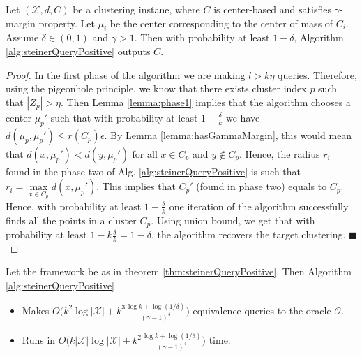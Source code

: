 \documentclass[orivec]{llncs}
\newcommand{\mc}{\mathcal}
\renewcommand{\qed}{\hfill\ensuremath{\blacksquare}}
\begin{document}
\begin{theorem}
\label{thm:steinerQueryPositive}
Let $(\mc X, d, C)$ be a clustering instane, where $C$ is center-based and satisfies $\gamma$-margin property. Let $\mu_i$ be the center corresponding to the center of mass of $C_i$.
Assume $\delta \in (0, 1)$ and $\gamma > 1$. Then with probability at least $1-\delta$, Algorithm \ref{alg:steinerQueryPositive} outputs $C$.
\end{theorem}

\begin{proof}
In the first phase of the algorithm we are making $l>k\eta$ queries. Therefore, using the pigeonhole principle, we know that there exists cluster index $p$ such that $|Z_p| > \eta$. Then Lemma \ref{lemma:phase1} implies that the algorithm chooses a center $\mu_p'$ such that with probability at least $1-\frac{\delta}{k}$ we have $d(\mu_p, \mu_p') \le r(C_p)\epsilon$. By Lemma \ref{lemma:hasGammaMargin}, this would mean that $d(x, \mu_p') < d(y, \mu_p')$ for all $x \in C_p$ and $y \not\in C_p$. Hence, the radius $r_i$ found in the phase two of Alg. \ref{alg:steinerQueryPositive} is such that $r_{i} = \max\limits_{x \in C_p} d(x, \mu_p')$. This implies that $C_p'$ (found in phase two) equals to $C_p$. Hence, with probability at least $1-\frac{\delta}{k}$ one iteration of the algorithm successfully finds all the points in a cluster $C_p$. Using union bound, we get that with probability at least $1-k\frac{\delta}{k} = 1-\delta$, the algorithm recovers the target clustering.
\qed 
\end{proof}

\begin{theorem}
\label{thm:steinerQueryPositiveComplexity}
Let the framework be as in theorem \ref{thm:steinerQueryPositive}. Then Algorithm \ref{alg:steinerQueryPositive} 
\begin{itemize}[nolistsep,noitemsep]
\item Makes $O\big(k^2\log |\mc X| + k^3\frac{\log k + \log (1/\delta)}{(\gamma - 1)^4}\big)$ equivalence queries to the oracle $\mc O$.
\item Runs in $O\big(k|\mc X|\log |\mc X| + k^2\frac{\log k + \log (1/\delta)}{(\gamma - 1)^4}\big)$ time.
\end{itemize}
\end{theorem}
\end{document}
